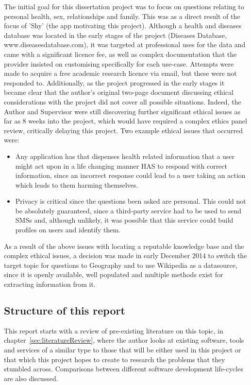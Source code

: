 \documentclass{article}
\begin{document}
The initial goal for this dissertation project was to focus on questions relating to personal health, sex, relationships and family.  This was as a direct result of the focus of 'Shy' (the app motivating this project).  Although a health and diseases database was located in the early stages of the project (Diseases Database, www.diseasesdatabase.com), it was targeted at professional uses for the data and came with a significant licence fee, as well as complex documentation that the provider insisted on customising specifically for each use-case.  Attempts were made to acquire a free academic research licence via email, but these were not responded to.  Additionally, as the project progressed in the early stages it became clear that the author's original two-page document discussing ethical considerations with the project did not cover all possible situations.  Indeed, the Author and Supervisor were still discovering further significant ethical issues as far as 8 weeks into the project, which would have required a complex ethics panel review, critically delaying this project.  Two example ethical issues that occurred were:

\begin{itemize}
  \item Any application has that dispenses health related information that a user might act upon in a life changing manner HAS to respond with correct information, since an incorrect response could lead to a user taking an action which leads to them harming themselves.
  \item Privacy is critical since the questions been asked are personal.  This could not be absolutely guaranteed, since a third-party service had to be used to send SMSs and, although unlikely, it was possible that this service could build profiles on users and identify them.
\end{itemize}

As a result of the above issues with locating a reputable knowledge base and the complex ethical issues, a decision was made in early December 2014 to switch the target topic for questions to Geography and to use Wikipedia as a datasource, since it is openly available, well populated and multiple methods exist for extracting information from it.

\subsection{Structure of this report}
This report starts with a review of pre-existing literature on this topic, in chapter~\ref{sec:literatureReview}, where the author looks at existing software, tools and services of a similar type to those that will be either used in this project or that which this project hopes to create to research the problems that they stumbled across.  Comparisons between different software development life-cycles are also discussed.
\end{document}
